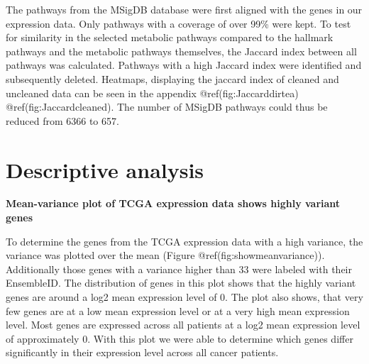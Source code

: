 \documentclass[
  parskip,
  oneside]{scrreprt}
\begin{document}
The pathways from the MSigDB database were first aligned with the genes
in our expression data. Only pathways with a coverage of over 99\% were
kept. To test for similarity in the selected metabolic pathways compared
to the hallmark pathways and the metabolic pathways themselves, the
Jaccard index between all pathways was calculated. Pathways with a high
Jaccard index were identified and subsequently deleted. Heatmaps,
displaying the jaccard index of cleaned and uncleaned data can be seen
in the appendix @ref(fig:Jaccarddirtea) @ref(fig:Jaccardcleaned). The
number of MSigDB pathways could thus be reduced from 6366 to 657.

\hypertarget{descriptive-analysis}{%
\section{Descriptive analysis}\label{descriptive-analysis}}

\textbf{Mean-variance plot of TCGA expression data shows highly variant
genes}

To determine the genes from the TCGA expression data with a high
variance, the variance was plotted over the mean (Figure
@ref(fig:showmeanvariance)). Additionally those genes with a variance
higher than 33 were labeled with their EnsembleID. The distribution of
genes in this plot shows that the highly variant genes are around a log2
mean expression level of 0. The plot also shows, that very few genes are
at a low mean expression level or at a very high mean expression level.
Most genes are expressed across all patients at a log2 mean expression
level of approximately 0. With this plot we were able to determine which
genes differ significantly in their expression level across all cancer
patients.
\end{document}
